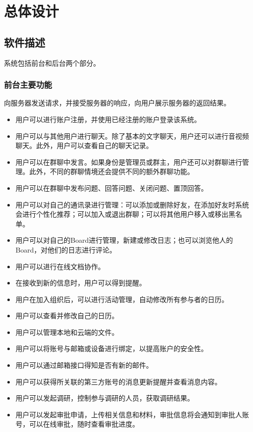 \chapter{\color{red} 总体设计}
\section{\color{red}软件描述}
    系统包括前台和后台两个部分。
\subsection{\color{red}前台主要功能}
    向服务器发送请求，并接受服务器的响应，向用户展示服务器的返回结果。
    
    \begin{itemize}
        \item 用户可以进行账户注册，并使用已经注册的账户登录该系统。
        \item 用户可以与其他用户进行聊天。除了基本的文字聊天，用户还可以进行音视频聊天。此外，用户可以查看自己的聊天记录。
        \item 用户可以在群聊中发言。如果身份是管理员或群主，用户还可以对群聊进行管理。此外，不同的群聊情境还会提供不同的额外群聊功能。
        \item {\color{red} 用户可以在群聊中发布问题、回答问题、关闭问题、置顶回答。}
        \item 用户可以对自己的通讯录进行管理：可以添加或删除好友，在添加好友时系统会进行个性化推荐；可以加入或退出群聊；可以将其他用户移入或移出黑名单。
        \item 用户可以对自己的Board进行管理，新建或修改日志；也可以浏览他人的Board，对他们的日志进行评论。
        \item 用户可以进行在线文档协作。
        \item 在接收到新的信息时，用户可以得到提醒。
        \item 用户在加入组织后，可以进行活动管理，自动修改所有参与者的日历。
        \item 用户可以查看并修改自己的日历。  
        \item 用户可以管理本地和云端的文件。
        \item 用户可以将账号与邮箱或设备进行绑定，以提高账户的安全性。
        \item 用户可以通过邮箱接口得知是否有新的邮件。
        \item \color{red} {用户可以获得所关联的第三方账号的消息更新提醒并查看消息内容。}
        \item \color{red} {用户可以发起调研，控制参与调研的人员，获取调研结果。}
        \item \color{red} {用户可以发起审批申请，上传相关信息和材料，审批信息将会通知到审批人账号，可以在线审批，随时查看审批进度。}
    \end{itemize}
    
